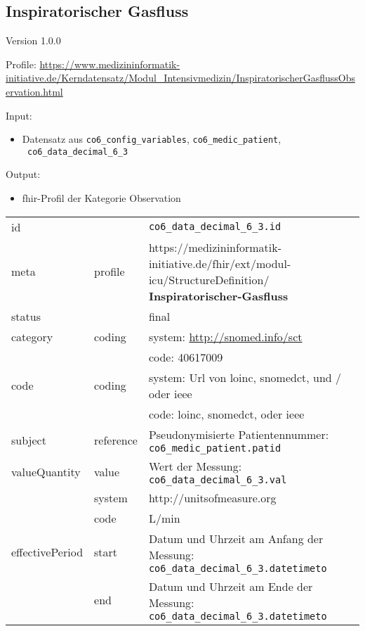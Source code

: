 \subsection{Inspiratorischer Gasfluss} 
\noindent Version 1.0.0

\noindent Profile: \url{https://www.medizininformatik-initiative.de/Kerndatensatz/Modul_Intensivmedizin/InspiratorischerGasflussObservation.html}

\noindent Input:
\begin{itemize}
	\item Datensatz aus \texttt{co6\_config\_variables}, \texttt{co6\_medic\_patient}, \\ \texttt{
co6\_data\_decimal\_6\_3}
\end{itemize}
Output:
\begin{itemize}
        \item \ac{fhir}-Profil der Kategorie \glqq Observation\grqq{}
\end{itemize}
\begin{longtable}{|l|l|p{7.5cm}|}
        \hline
        \rowcolor{lightgray} \multicolumn{3}{|l|}{Data Mapping (inhaltlich)} \\ \hline
        id &  & \texttt{co6\_data\_decimal\_6\_3.id} \\ \hline
	meta & profile & https://medizininformatik-initiative.de/fhir/ext/modul-icu/StructureDefinition/\textbf{
Inspiratorischer-Gasfluss} \\ \hline 
	status &  & final  \\ \hline 
	category & coding & system: \url{http://snomed.info/sct} \\
\cline{3-3}
	& & code: 40617009 \\ \hline
	code & coding & system: Url von \ac{loinc}, \ac{snomedct}, und / oder \ac{ieee} \\ 
	\cline{3-3} 
	 &  & code: \ac{loinc}, \ac{snomedct}, oder \ac{ieee} \\ \hline
	subject & reference & Pseudonymisierte Patientennummer: \texttt{co6\_medic\_patient.patid} \\ \hline
	valueQuantity & value & Wert der Messung: \texttt{
co6\_data\_decimal\_6\_3.val} \\
        \cline{2-3}
         & system & http://unitsofmeasure.org \\
         \cline{2-3}
         & code & L/min
\\ \hline
    effectivePeriod & start & Datum und Uhrzeit am Anfang der Messung: \texttt{
co6\_data\_decimal\_6\_3.datetimeto} \\
    \cline{2-3}
     & end & Datum und Uhrzeit am Ende der Messung: \texttt{
co6\_data\_decimal\_6\_3.datetimeto} \\ \hline
\end{longtable}


